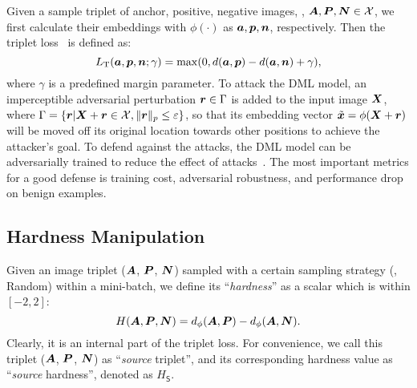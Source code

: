 \documentclass[10pt,twocolumn,letterpaper]{article}
\begin{document}
Given a sample triplet of anchor, positive, negative images, \ie, ${\bm{A}}, {\bm{P}},
{\bm{N}} \in \mathcal{X}$, we first calculate their embeddings with $\phi(\cdot)$ as
${\bm{a}}, {\bm{p}}, {\bm{n}}$, respectively.
%
Then the triplet loss~\cite{facenet} is defined as:
%
\begin{equation}
%
	L_\text{T}(\va, \vp, \vn; \gamma) = \max(0, d(\va, \vp) - d(\va, \vn) +
	\gamma),
	\end{equation}
%
%
where $\gamma$ is a predefined margin parameter.
%
To attack the DML model, an imperceptible adversarial perturbation ${\bm{r}} \in
\Gamma$ is added to the input image ${\bm{X}}$, where $\Gamma = \{{\bm{r}} | {\bm{X}}+{\bm{r}}\in
\mathcal{X},  \|{\bm{r}}\|_p \leq \varepsilon\}$, so that its embedding vector
$\tilde{{\bm{x}}}=\phi({\bm{X}}+{\bm{r}})$ will be moved off its original location towards
other positions to achieve the attacker's goal.
%
To defend against the attacks, the DML model can be adversarially trained to
reduce the effect of attacks~\cite{advrank,robrank}.
%
The most important metrics for a good defense is training cost, adversarial
robustness, and performance drop on benign examples.

\subsection{Hardness Manipulation}
\label{sec:31}


Given an image triplet (${\bm{A}}$, ${\bm{P}}$, ${\bm{N}}$) sampled with a certain sampling
strategy (\eg, Random) within a mini-batch, we define its ``\emph{hardness}''
as a scalar which is within $[-2,2]$:
%
\begin{equation}
%
H(\mA,\mP,\mN)=d_\phi(\mA,\mP)-d_\phi(\mA,\mN).
%
\end{equation}
%
Clearly, it is an internal part of the triplet loss.
%
For convenience, we call this triplet (${\bm{A}}$, ${\bm{P}}$, ${\bm{N}}$) as ``\emph{source}
triplet'', and its corresponding hardness value as ``\emph{source} hardness'',
denoted as $H_\mathsf{S}$.

\end{document}

